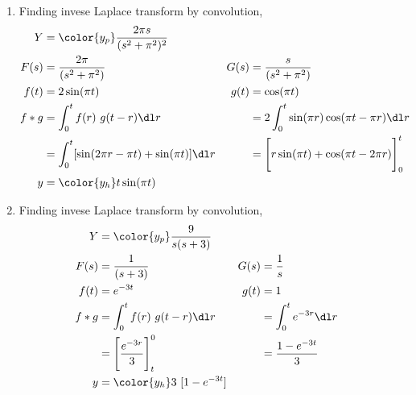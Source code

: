 \begin{enumerate}
    \item Finding invese Laplace transform by convolution,
          \begin{align}
              Y     & = \color{y_p} \frac{2\pi s}{(s^2 + \pi^2)^2}               \\
              F(s)  & = \frac{2\pi}{(s^2 + \pi^2)}                             &
              G(s)  & = \frac{s}{(s^2 + \pi^2)}                                  \\
              f(t)  & = 2\sin(\pi t)                                           &
              g(t)  & = \cos(\pi t)                                              \\
              f * g & = \int_{0}^{t} f(r)\ g(t-r) \dl r                        &
                    & = 2\int_{0}^{t} \sin(\pi r)  \cos(\pi t - \pi r) \dl r     \\
                    & = \int_{0}^{t} [\sin(2\pi r - \pi t) + \sin(\pi t)]\dl r &
                    & = \Bigg[ r \sin(\pi t) + \cos(\pi t - 2\pi r) \Bigg]_0^t   \\
              y     & = \color{y_h} t\sin(\pi t)
          \end{align}

    \item Finding invese Laplace transform by convolution,
          \begin{align}
              Y     & = \color{y_p} \frac{9}{s(s + 3)}        \\
              F(s)  & = \frac{1}{(s + 3)}                   &
              G(s)  & = \frac{1}{s}                           \\
              f(t)  & = e^{-3t}                             &
              g(t)  & = 1                                     \\
              f * g & = \int_{0}^{t} f(r)\ g(t-r) \dl r     &
                    & = \int_{0}^{t} e^{-3r} \dl r            \\
                    & = \Bigg[ \frac{e^{-3r}}{3} \Bigg]_t^0 &
                    & = \frac{1 - e^{-3t}}{3}                 \\
              y     & = \color{y_h} 3\ [1 - e^{-3t}]
          \end{align}


\end{enumerate}
